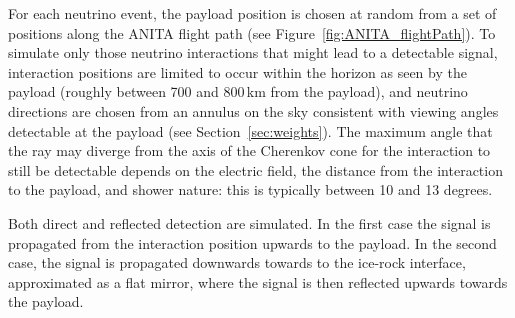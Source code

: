 For each neutrino event, the payload position is chosen at random from a set of positions along the ANITA flight path (see Figure~\ref{fig:ANITA_flightPath}).
To simulate only those neutrino interactions that might lead to a detectable signal, interaction positions are limited to occur within the horizon as seen by the payload (roughly between 700 and 800\,km from the payload), and neutrino directions are chosen from an annulus on the sky consistent with viewing angles detectable at the payload (see Section~\ref{sec:weights}). 
The maximum angle that the ray may diverge from the axis of the Cherenkov cone for the interaction to still be detectable depends on the electric field, the distance from the interaction to the payload, and shower nature: this is typically between 10 and 13 degrees.

Both direct and reflected detection are simulated.
In the first case the signal is propagated from the interaction position upwards to the payload. In the second case, the signal is propagated downwards
towards to the ice-rock interface, approximated as a flat mirror,
where the signal is then reflected upwards towards the payload. 




